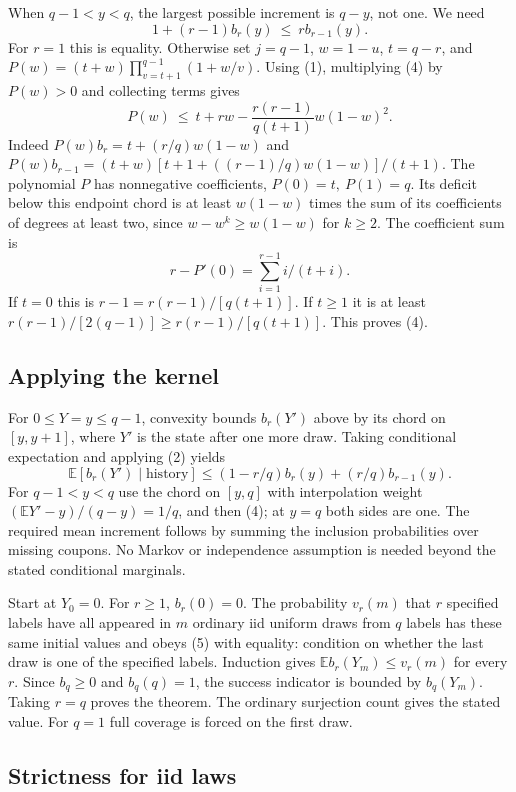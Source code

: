 \documentclass[10pt]{article}
\begin{document}
When \(q-1<y<q\), the largest possible increment is \(q-y\), not one. We
need \[
 1+(r-1)b_r(y)\ \le\ r b_{r-1}(y).                           \tag{4}
\] For \(r=1\) this is equality. Otherwise set \(j=q-1\), \(w=1-u\),
\(t=q-r\), and \(P(w)=(t+w)\prod_{v=t+1}^{q-1}(1+w/v)\). Using (1),
multiplying (4) by \(P(w)>0\) and collecting terms gives \[
 P(w)\ \le\ t+rw-\frac{r(r-1)}{q(t+1)}w(1-w)^2.
\] Indeed \(P(w)b_r=t+(r/q)w(1-w)\) and
\(P(w)b_{r-1}=(t+w)[t+1+((r-1)/q)w(1-w)]/(t+1)\). The polynomial \(P\)
has nonnegative coefficients, \(P(0)=t,\ P(1)=q\). Its deficit below
this endpoint chord is at least \(w(1-w)\) times the sum of its
coefficients of degrees at least two, since \(w-w^k\ge w(1-w)\) for
\(k\ge2\). The coefficient sum is \[
 r-P'(0)=\sum_{i=1}^{r-1} i/(t+i).
\] If \(t=0\) this is \(r-1=r(r-1)/[q(t+1)]\). If \(t\ge1\) it is at
least \(r(r-1)/[2(q-1)]\ge r(r-1)/[q(t+1)]\). This proves (4).

\subsection*{Applying the kernel}\label{applying-the-kernel}

For \(0\le Y=y\le q-1\), convexity bounds \(b_r(Y')\) above by its chord
on \([y,y+1]\), where \(Y'\) is the state after one more draw. Taking
conditional expectation and applying (2) yields \[
 \mathbb E[b_r(Y')\mid\text{history}]
 \le (1-r/q)b_r(y)+(r/q)b_{r-1}(y).                         \tag{5}
\] For \(q-1<y<q\) use the chord on \([y,q]\) with interpolation weight
\((\mathbb E Y'-y)/(q-y)=1/q\), and then (4); at \(y=q\) both sides are
one. The required mean increment follows by summing the inclusion
probabilities over missing coupons. No Markov or independence assumption
is needed beyond the stated conditional marginals.

Start at \(Y_0=0\). For \(r\ge1\), \(b_r(0)=0\). The probability
\(v_r(m)\) that \(r\) specified labels have all appeared in \(m\)
ordinary iid uniform draws from \(q\) labels has these same initial
values and obeys (5) with equality: condition on whether the last draw
is one of the specified labels. Induction gives
\(\mathbb E b_r(Y_m)\le v_r(m)\) for every \(r\). Since \(b_q\ge0\) and
\(b_q(q)=1\), the success indicator is bounded by \(b_q(Y_m)\). Taking
\(r=q\) proves the theorem. The ordinary surjection count gives the
stated value. For \(q=1\) full coverage is forced on the first draw.

\subsection*{Strictness for iid laws}\label{strictness-for-iid-laws}
\end{document}
